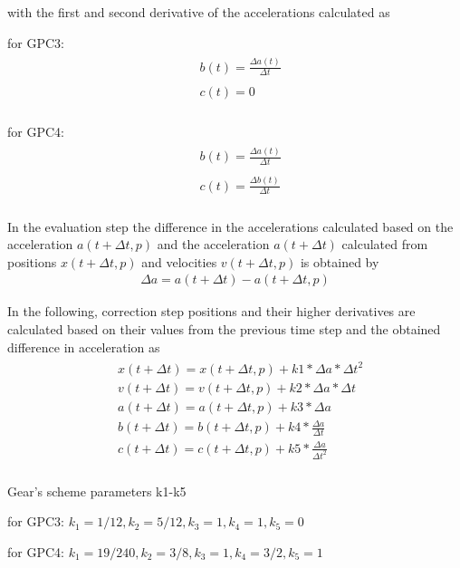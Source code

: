 with the first and second derivative of the accelerations calculated as\par
for GPC3:
\begin{align}\label{eqn:gearJerk3}
    \begin{split}
        &b(t) = \frac{\Delta{a(t)}}{\Delta{t}}\\
        \\
        &c(t) = 0\\
    \end{split}
\end{align}\par
for GPC4:
\begin{align}\label{eqn:gearJerk4}
    \begin{split}
        &b(t) = \frac{\Delta{a(t)}}{\Delta{t}}\\
        \\
        &c(t) = \frac{\Delta{b(t)}}{\Delta{t}}\\
    \end{split}
\end{align}
\par
In the evaluation step the difference in the accelerations calculated based on the acceleration
$a(t+ \Delta{t}, p)$ and the acceleration $a(t+\Delta{t})$ calculated from positions $x(t+\Delta{t},
p)$ and velocities $v(t+\Delta{t}, p)$ is obtained by
\begin{align}\label{eqn:gearDa}
    \Delta{a} = a(t + \Delta{t}) - a(t + \Delta{t}, p)
\end{align}
\par
In the following, correction step positions and their higher derivatives are calculated based on
their values from the previous time step and the obtained difference in acceleration as
\begin{align}\label{eqn:gearCorrector}
    \begin{split}
        &x(t+\Delta{t}) = x(t+\Delta{t}, p) + k1 * \Delta{a} * \Delta{t}^2\\
        &v(t+\Delta{t}) = v(t+\Delta{t}, p) + k2 * \Delta{a} * \Delta{t}\\
        &a(t+\Delta{t}) = a(t+\Delta{t}, p) + k3 * \Delta{a}\\
        &b(t+\Delta{t}) = b(t+\Delta{t}, p) + k4 * \frac{\Delta{a}}{\Delta{t}}\\
        &c(t+\Delta{t}) = c(t+\Delta{t}, p) + k5 * \frac{\Delta{a}}{\Delta{t}^2}\\
    \end{split}
\end{align}
\par
Gear’s scheme parameters k1-k5\par
for GPC3:
$k_1 = 1/12, k_2 = 5/12, k_3 = 1, k_4 = 1, k_5 = 0$\par
for GPC4:
$k_1 = 19/240, k_2 = 3/8, k_3 = 1, k_4 = 3/2, k_5 = 1$
\par
\newpage